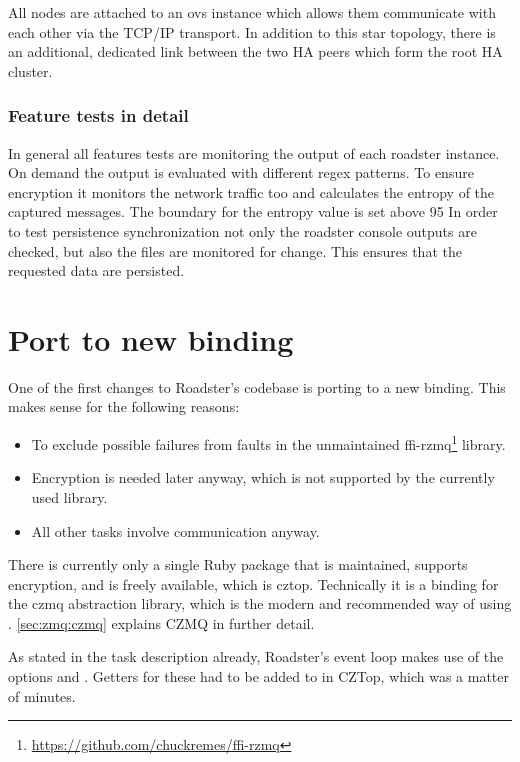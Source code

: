 All nodes are attached to an \gls{ovs} instance which allows them communicate with each
other via the TCP/IP transport. In addition to this star topology, there is an
additional, dedicated link between the two HA peers which form the root HA
cluster.

\subsubsection{Feature tests in detail}
In general all features tests are monitoring the output of each roadster instance.
On demand the output is evaluated with different regex patterns.
To ensure encryption it monitors the network traffic too and calculates
the entropy of the captured messages. The boundary for the entropy value is set
above 95%
In order to test persistence synchronization not only the roadster console outputs are checked, 
but also the files are monitored for change. This ensures that the requested data
are persisted.



\section{Port to new \zmq binding}\label{sec:approach:port}
One of the first changes to Roadster's codebase is porting to a new \zmq
binding. This makes sense for the following reasons:

\begin{itemize}
\item To exclude possible failures from faults in the unmaintained ffi-rzmq\footnote{\url{https://github.com/chuckremes/ffi-rzmq}} library.
\item Encryption is needed later anyway, which is not supported by the currently used library.
\item All other tasks involve \zmq communication anyway.
\end{itemize}

There is currently only a single Ruby package that is maintained, supports
encryption, and is freely available, which is \gls{cztop}. Technically it is a
binding for the \gls{czmq} abstraction library, which is the modern and recommended way of
using \zmq. \autoref{sec:zmq:czmq} explains CZMQ in further detail.

As stated in the task description already, Roadster's event loop makes use of
the \zmq options  and . Getters for these had to be
added to in CZTop, which was a matter of minutes.

